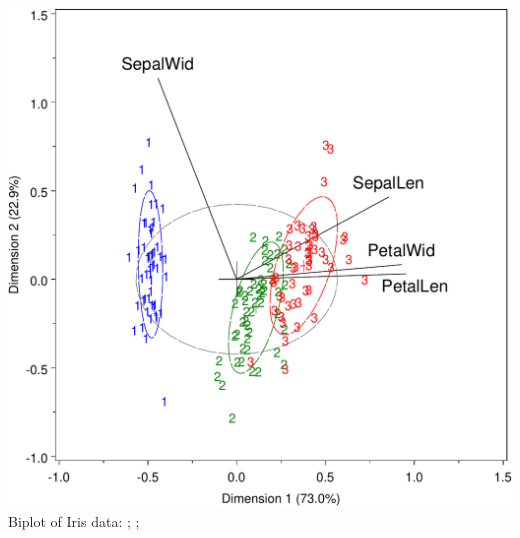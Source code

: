 \begin{frame}
\begin{center}
  \includegraphics[height=.9\textheight,clip]{fig/bipliris}
  \\ Biplot of Iris data: ; ;
\end{center}

\end{frame}
